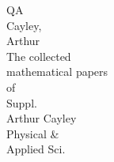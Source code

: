 \documentclass[11pt,a4paper]{book}
\begin{document}
\clearpage
\thispagestyle{empty}
\begin{center}
\vspace*{\fill}
\begin{minipage}{0.6\textwidth}
\centering
\small
\textsc{QA}\\[0.5em]
Cayley,\\
Arthur\\[0.5em]
The collected\\
mathematical papers\\
of\\[0.5em]
Suppl.\\
Arthur Cayley\\[1em]
Physical \&\\
Applied Sci.\\[2em]
\end{minipage}
\vspace*{\fill}
\end{center}

\clearpage
\thispagestyle{empty}
\null  %
\clearpage
\end{document}
